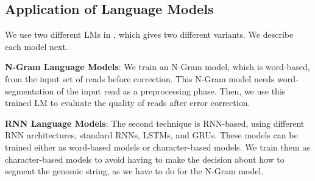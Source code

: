 
\subsection{Application of Language Models}
We use two different LMs in \name, which gives two different variants. We describe each model next.

\noindent \textbf{N-Gram Language Models}: %
We train an N-Gram model, which is word-based, from the input set of reads before correction. This N-Gram model needs word-segmentation of the input read as a preprocessing phase. Then, we use this trained LM to evaluate the quality of reads after error correction.

\noindent \textbf{RNN Language Models}: The second technique is RNN-based, using different RNN architectures, \eg standard RNNs, LSTMs, and GRUs.
These models can be trained either as word-based models or character-based models. We train them as character-based models to avoid having to make the decision about how to segment the genomic string, as we have to do for the N-Gram model.


